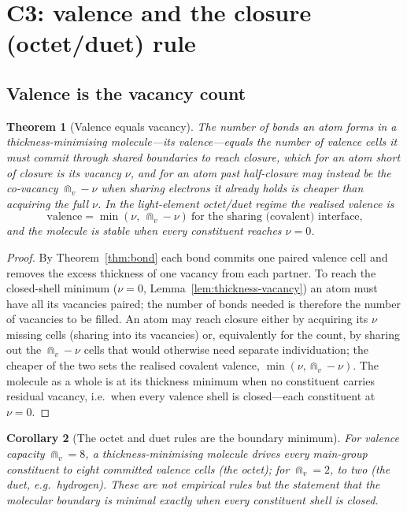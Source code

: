 \documentclass[11pt,a4paper]{article}
\theoremstyle{thmstyle}
\newtheorem{theorem}{Theorem}[section]
\newtheorem{corollary}[theorem]{Corollary}
\theoremstyle{definition}
\theoremstyle{remark}
\newcommand{\vac}{\nu}                 %
\begin{document}
\section{C3: valence and the closure (octet/duet) rule}
\label{sec:valence}

\subsection{Valence is the vacancy count}

\begin{theorem}[Valence equals vacancy]
\label{thm:valence}
The number of bonds an atom forms in a thickness-minimising molecule---its
\emph{valence}---equals the number of valence cells it must commit through
shared boundaries to reach closure, which for an atom short of closure is
its vacancy $\vac$, and for an atom past half-closure may instead be the
co-vacancy $\Cap_v-\vac$ when sharing electrons it already holds is
cheaper than acquiring the full $\vac$. In the light-element octet/duet
regime the realised valence is
\[
\mathrm{valence}=\min(\vac,\ \Cap_v-\vac)\ \text{for the sharing
(covalent) interface,}
\]
and the molecule is stable when every constituent reaches $\vac=0$.
\end{theorem}

\begin{proof}
By Theorem~\ref{thm:bond} each bond commits one paired valence cell and
removes the excess thickness of one vacancy from each partner. To reach
the closed-shell minimum ($\vac=0$, Lemma~\ref{lem:thickness-vacancy})
an atom must have all its vacancies paired; the number of bonds needed is
therefore the number of vacancies to be filled. An atom may reach closure
either by acquiring its $\vac$ missing cells (sharing into its vacancies)
or, equivalently for the count, by sharing out the $\Cap_v-\vac$ cells
that would otherwise need separate individuation; the cheaper of the two
sets the realised covalent valence, $\min(\vac,\Cap_v-\vac)$. The molecule
as a whole is at its thickness minimum when no constituent carries
residual vacancy, i.e.\ when every valence shell is closed---each
constituent at $\vac=0$.
\end{proof}

\begin{corollary}[The octet and duet rules are the boundary minimum]
\label{cor:octet}
For valence capacity $\Cap_v=8$, a thickness-minimising molecule drives
every main-group constituent to eight committed valence cells (the octet);
for $\Cap_v=2$, to two (the duet, e.g.\ hydrogen). These are not empirical
rules but the statement that the molecular boundary is minimal exactly
when every constituent shell is closed.
\end{corollary}
\end{document}
